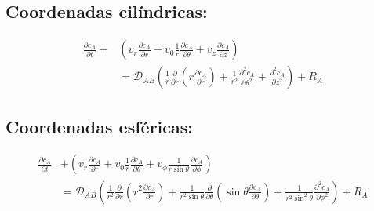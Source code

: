 \subsection*{Coordenadas cilíndricas:}
\begin{equation} 
    \begin{split} 
    \frac{\partial c_A}{\partial t} + &\left( v_r \frac{\partial c_A}{\partial r} + v_0 \frac{1}{r} \frac{\partial c_A}{\partial \theta} + v_z \frac{\partial c_A}{\partial z} \right) \\
      &= \mathcal{D}_{AB} \left( \frac{1}{r} \frac{\partial}{\partial r} \left( r \frac{\partial c_A}{\partial r} \right) + \frac{1}{r^2} \frac{\partial^2 c_A}{\partial \theta^2} + \frac{\partial^2 c_A}{\partial z^2} \right) + R_A
    \end{split} 
    \tag{B}
\end{equation}

\subsection*{Coordenadas esféricas:}
\begin{equation}
    \begin{split}
        \frac{\partial c_A}{\partial t} &+ \left( v_r \frac{\partial c_A}{\partial r} + v_0 \frac{1}{r} \frac{\partial c_A}{\partial \theta} + v_\phi \frac{1}{r \sin \theta} \frac{\partial c_A}{\partial \phi} \right) \\
        &= \mathcal{D}_{AB} \left( \frac{1}{r^2} \frac{\partial}{\partial r} \left( r^2 \frac{\partial c_A}{\partial r} \right) + \frac{1}{r^2 \sin \theta} \frac{\partial}{\partial \theta} \left( \sin \theta \frac{\partial c_A}{\partial \theta} \right) + \frac{1}{r^2 \sin^2 \theta} \frac{\partial^2 c_A}{\partial \phi^2} \right) + R_A 
    \end{split}
    \tag{C}
\end{equation}
